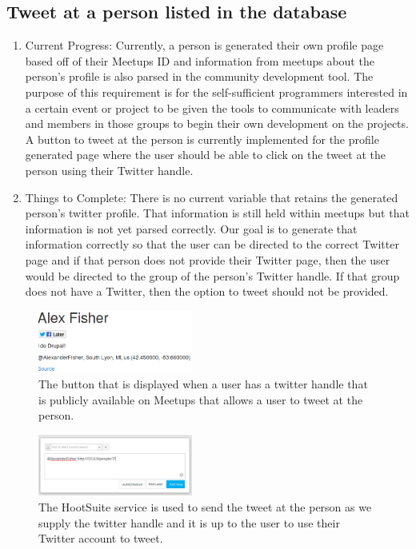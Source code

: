 \documentclass[letterpaper,10pt,onecolumn]{IEEEtran} %
\begin{document}
\subsection{Tweet at a person listed in the database}
\begin{enumerate}[label*=\arabic*.]
\item Current Progress: Currently, a person is generated their own profile page based off of their Meetups ID and information from meetups about the person’s profile is also parsed in the community development tool. The purpose of this requirement is for the self-sufficient programmers interested in a certain event or project to be given the tools to communicate with leaders and members in those groups to begin their own development on the projects. A button to tweet at the person is currently implemented for the profile generated page where the user should be able to click on the tweet at the person using their Twitter handle.

\item Things to Complete: There is no current variable that retains the generated person’s twitter profile. That information is still held within meetups but that information is not yet parsed correctly. Our goal is to generate that information correctly so that the user can be directed to the correct Twitter page and if that person does not provide their Twitter page, then the user would be directed to the group of the person’s Twitter handle. If that group does not have a Twitter, then the option to tweet should not be provided.
\end{enumerate}

\begin{figure}[htp]
  \begin{center}
  
  \includegraphics[width=2in]{tweet_person1}
  \centering
  \caption{The button that is displayed when a user has a twitter handle that is publicly available on Meetups that allows a user to tweet at the person.}

  \end{center}
\end{figure}

\begin{figure}[htp]
  \begin{center}
  
  \includegraphics[width=2in]{tweet_person2}
  \centering
  \caption{The HootSuite service is used to send the tweet at the person as we supply the twitter handle and it is up to the user to use their Twitter account to tweet.}

  \end{center}
\end{figure}
\end{document}
